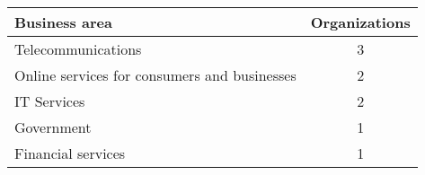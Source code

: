 \centering
{} \label{businessareatable}
\begin{tabular}{ l c }
	\bfseries{Business area} & \bfseries{Organizations} \\
	\hline
	Telecommunications & 3 \\
	Online services for consumers and businesses & 2 \\
	IT Services & 2 \\
	Government & 1 \\
	Financial services & 1 \\
	\hline
\end{tabular}
\justify
